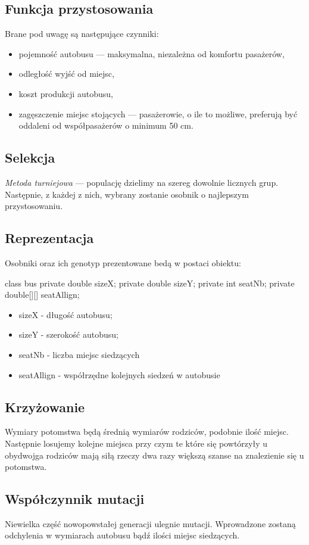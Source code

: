 \documentclass[10pt,a4paper]{article}
\begin{document}
\subsection{Funkcja przystosowania}
Brane pod uwagę są następujące czynniki:
\begin{itemize}
    \item pojemność autobusu --- maksymalna, niezależna od komfortu pasażerów,
    \item odległość wyjść od miejsc,
    \item koszt produkcji autobusu,
    \item zagęszczenie miejsc stojących --- pasażerowie, o ile to możliwe,
      preferują być oddaleni od współpasażerów o minimum 50 cm.
\end{itemize}


\subsection{Selekcja}
\emph{Metoda turniejowa} --- populację dzielimy na szereg dowolnie licznych
grup. Następnie, z każdej z nich, wybrany zostanie osobnik o najlepszym
przystosowaniu.


\subsection{Reprezentacja} 
Osobniki oraz ich genotyp prezentowane bedą w postaci obiektu:\\

\begin{SmallVerbatim}
    class bus{
	    private double sizeX;
	    private double sizeY;
	    private int seatNb;
	    private double[][] seatAllign;
    }
\end{SmallVerbatim}

\begin{itemize}
	\item sizeX - długość autobusu;
	\item sizeY - szerokość autobusu;
	\item seatNb - liczba miejsc siedzących
	\item seatAllign - współrzędne kolejnych siedzeń w autobusie
\end{itemize}
	

\subsection{Krzyżowanie}
Wymiary potomstwa będą średnią wymiarów rodziców, podobnie ilość miejsc.
Następnie losujemy kolejne miejsca przy czym te które się powtórzyły u obydwojga
rodziców mają siłą rzeczy dwa razy większą szanse na znalezienie się u
potomstwa.

\subsection{Współczynnik mutacji}
Niewielka część nowopowstałej generacji ulegnie mutacji. Wprowadzone zostaną 
odchylenia w wymiarach autobusu bądź ilości miejsc siedzących.
\end{document}

